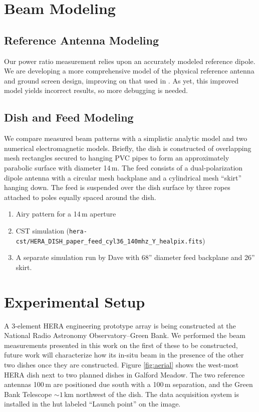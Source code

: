 \documentclass{emulateapj}
\begin{document}
\section{Beam Modeling}

\subsection{Reference Antenna Modeling}
Our power ratio measurement relies upon an accurately modeled reference dipole. We are developing a more comprehensive model of the physical reference antenna and ground screen design, improving on that used in \citep{neben15}. As yet, this improved model yields incorrect results, so more debugging is needed.

\subsection{Dish and Feed Modeling}
\label{sec:dishmodels}

We compare measured beam patterns with a simplistic analytic model and two numerical electromagnetic models. Briefly, the dish is constructed of overlapping mesh rectangles secured to hanging PVC pipes to form an approximately parabolic surface with diameter 14\,m. The feed consists of a dual-polarization dipole antenna with a circular mesh backplane and a cylindrical mesh ``skirt'' hanging down. The feed is suspended over the dish surface by three ropes attached to poles equally spaced around the dish.

\begin{enumerate}
	\item Airy pattern for a 14\,m aperture
	\item CST simulation (\texttt{hera-cst/HERA\_DISH\_paper\_feed\_cyl36\_140mhz\_Y\_healpix.fits})
	\item A separate simulation run by Dave with 68'' diameter feed backplane and 26'' skirt.
\end{enumerate}


\section{Experimental Setup}

A 3-element HERA engineering prototype array is being constructed at the National Radio Astronomy Observatory--Green Bank. We performed the beam measurements presented in this work on the first of these to be constructed, future work will characterize how its in-situ beam in the presence of the other two dishes once they are constructed. Figure \ref{fig:aerial} shows the west-most HERA dish next to two planned dishes in Galford Meadow. The two reference antennas 100\,m are positioned due south with a 100\,m separation, and the Green Bank Telescope $\sim1$\,km northwest of the dish. The data acquisition system is installed in the hut labeled ``Launch point'' on the image. 
\end{document}

